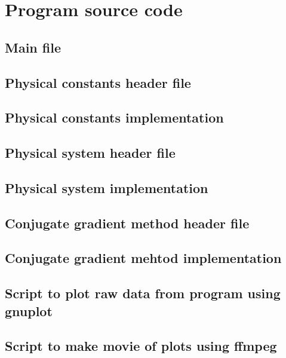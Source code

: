 \appendix
\chapter{Program source code}
\label{ap:source_code}
\section{Main file}



\section{Physical constants header file}



\section{Physical constants implementation}



\section{Physical system header file}



\section{Physical system implementation}



\section{Conjugate gradient method header file}



\section{Conjugate gradient mehtod implementation}



\section{Script to plot raw data from program using gnuplot}



\section{Script to make movie of plots using ffmpeg}





